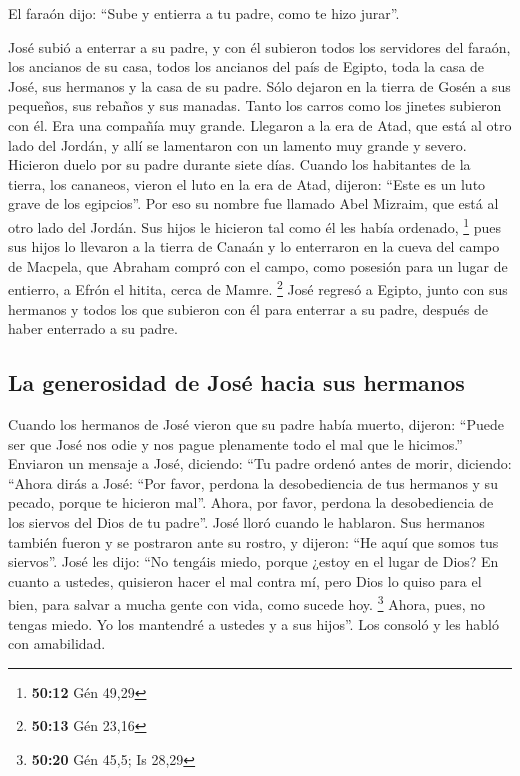  El faraón dijo: ``Sube y entierra a tu padre, como te
hizo jurar''.

 José subió a enterrar a su padre, y con él subieron todos
los servidores del faraón, los ancianos de su casa, todos los ancianos
del país de Egipto,  toda la casa de José, sus hermanos y
la casa de su padre. Sólo dejaron en la tierra de Gosén a sus pequeños,
sus rebaños y sus manadas.  Tanto los carros como los
jinetes subieron con él. Era una compañía muy grande. 
Llegaron a la era de Atad, que está al otro lado del Jordán, y allí se
lamentaron con un lamento muy grande y severo. Hicieron duelo por su
padre durante siete días.  Cuando los habitantes de la
tierra, los cananeos, vieron el luto en la era de Atad, dijeron: ``Este
es un luto grave de los egipcios''. Por eso su nombre fue llamado Abel
Mizraim, que está al otro lado del Jordán.  Sus hijos le
hicieron tal como él les había ordenado, \footnote{\textbf{50:12} Gén
  49,29}  pues sus hijos lo llevaron a la tierra de
Canaán y lo enterraron en la cueva del campo de Macpela, que Abraham
compró con el campo, como posesión para un lugar de entierro, a Efrón el
hitita, cerca de Mamre. \footnote{\textbf{50:13} Gén 23,16}
 José regresó a Egipto, junto con sus hermanos y todos
los que subieron con él para enterrar a su padre, después de haber
enterrado a su padre.

\hypertarget{la-generosidad-de-josuxe9-hacia-sus-hermanos}{%
\subsection{La generosidad de José hacia sus
hermanos}\label{la-generosidad-de-josuxe9-hacia-sus-hermanos}}

 Cuando los hermanos de José vieron que su padre había
muerto, dijeron: ``Puede ser que José nos odie y nos pague plenamente
todo el mal que le hicimos.''  Enviaron un mensaje a
José, diciendo: ``Tu padre ordenó antes de morir, diciendo:
 ``Ahora dirás a José: ``Por favor, perdona la
desobediencia de tus hermanos y su pecado, porque te hicieron mal''.
Ahora, por favor, perdona la desobediencia de los siervos del Dios de tu
padre''. José lloró cuando le hablaron.  Sus hermanos
también fueron y se postraron ante su rostro, y dijeron: ``He aquí que
somos tus siervos''.  José les dijo: ``No tengáis miedo,
porque ¿estoy en el lugar de Dios?  En cuanto a ustedes,
quisieron hacer el mal contra mí, pero Dios lo quiso para el bien, para
salvar a mucha gente con vida, como sucede hoy. \footnote{\textbf{50:20}
  Gén 45,5; Is 28,29}  Ahora, pues, no tengas miedo. Yo
los mantendré a ustedes y a sus hijos''. Los consoló y les habló con
amabilidad.

